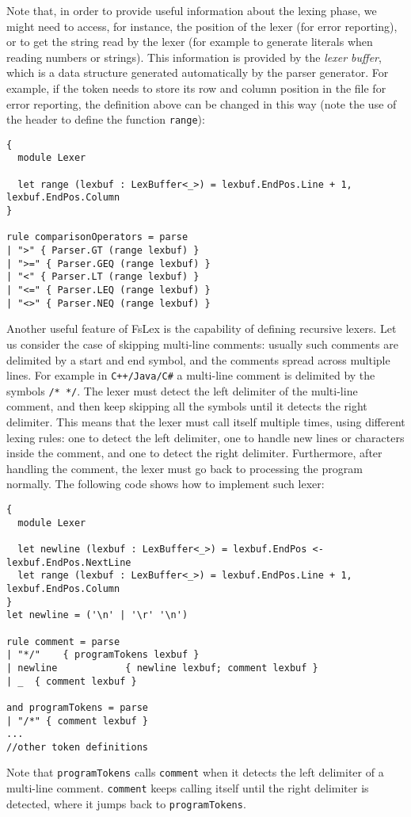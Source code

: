 Note that, in order to provide useful information about the lexing phase, we might need to access, for instance, the position of the lexer (for error reporting), or to get the string read by the lexer (for example to generate literals when reading numbers or strings). This information is provided by the \textit{lexer buffer}, which is a data structure generated automatically by the parser generator. For example, if the token needs to store its row and column position in the file for error reporting, the definition above can be changed in this way (note the use of the header to define the function \texttt{range}):


\begin{lstlisting}
{
  module Lexer
  
  let range (lexbuf : LexBuffer<_>) = lexbuf.EndPos.Line + 1, lexbuf.EndPos.Column
}

rule comparisonOperators = parse
| ">" { Parser.GT (range lexbuf) }
| ">=" { Parser.GEQ (range lexbuf) }
| "<" { Parser.LT (range lexbuf) }
| "<=" { Parser.LEQ (range lexbuf) }
| "<>" { Parser.NEQ (range lexbuf) }
\end{lstlisting}

Another useful feature of FsLex is the capability of defining recursive lexers. Let us consider the case of skipping multi-line comments: usually such comments are delimited by a start and end symbol, and the comments spread across multiple lines. For example in \texttt{C++/Java/C\#} a multi-line comment is delimited by the symbols \texttt{/* */}. The lexer must detect the left delimiter of the multi-line comment, and then keep skipping all the symbols until it detects the right delimiter. This means that the lexer must call itself multiple times, using different lexing rules: one to detect the left delimiter, one to handle new lines or characters inside the comment, and one to detect the right delimiter. Furthermore, after handling the comment, the lexer must go back to processing the program normally. The following code shows how to implement such lexer:

\begin{lstlisting}
{
  module Lexer
  
  let newline (lexbuf : LexBuffer<_>) = lexbuf.EndPos <- lexbuf.EndPos.NextLine
  let range (lexbuf : LexBuffer<_>) = lexbuf.EndPos.Line + 1, lexbuf.EndPos.Column
}
let newline = ('\n' | '\r' '\n')

rule comment = parse
| "*/"    { programTokens lexbuf }
| newline            { newline lexbuf; comment lexbuf }
| _  { comment lexbuf }

and programTokens = parse
| "/*" { comment lexbuf }
...
//other token definitions
\end{lstlisting}
Note that \texttt{programTokens} calls \texttt{comment} when it detects the left delimiter of a multi-line comment. \texttt{comment} keeps calling itself until the right delimiter is detected, where it jumps back to \texttt{programTokens}.

